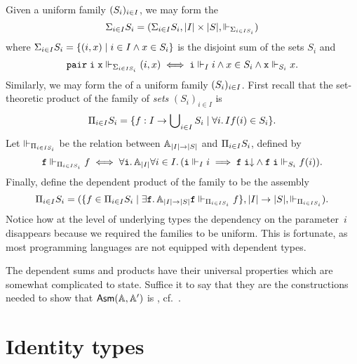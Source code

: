 Given a uniform family $(\asm{S}_i)_{i \in \asm{I}}$, we may form the
%
\begin{equation*}
  \dsum_{i \in \asm{I}} \asm{S}_i =
  (\dsum_{i \in I} S_i, |I| \times |S|, \rz[\dsum_{i \in I S_i}])
\end{equation*}
%
where $\dsum_{i \in I} S_i = \set{(i,x) \such i \in I \land x \in
  S_i}$ is the disjoint sum of the sets $S_i$ and
%
\begin{equation*}
  \combPair\;\R{i}\;\R{x} \rz[\dsum_{i \in I S_i}] (i, x)
  \iff
  \R{i} \rz[I] i
  \land
  x \in S_i
  \land
  \R{x} \rz[S_i] x.  
\end{equation*}
%
Similarly, we may form the  of a uniform
family $(\asm{S}_i)_{i \in \asm{I}}$. First recall that the
set-theoretic product of the family of \emph{sets} $(S_i)_{i \in I}$
is
%
\begin{equation*}
  \dprod_{i \in I} S_i =
  \set{f : I \to \tbigcup_{i \in I} S_i \such
    \all{i}{I}{f(i) \in S_i}
  }.
\end{equation*}
%
Let $\rz[\dprod_{i \in I S_i}]$ be the relation between $\Atyp{|I|
  \to |S|}$ and $\dprod_{i \in I} S_i$, defined by
%
\begin{equation*}
  \R{f} \rz[\dprod_{i \in I S_i}] f
  \iff
  \all{\R{i}}{\Atyp{|I|}}{
    \all{i \in I}
      (\R{i} \rz[I] i
      \implies
      \defined{\R{f}\;\R{i}} \land
      \R{f}\;\R{i} \rz[S_i] f(i))
  }.
\end{equation*}
%
Finally, define the dependent product of the family to be the assembly
%
\begin{equation*}
  \dprod_{i \in \asm{I}} \asm{S}_i =
  (\set{f \in \dprod_{i \in I} S_i \such
    \some{\R{f}}{\Atyp{|I| \to |S|}}{\R{f} \rz[\dprod_{i \in I S_i}]
      f}},
  |I| \to |S|, {\rz[\dprod_{i \in I S_i}]}).
\end{equation*}
%
Notice how at the level of underlying types the dependency on the
parameter~$i$ disappears because we required the families to be
uniform. This is fortunate, as most programming languages are not
equipped with dependent types.

The dependent sums and products have their universal properties which
are somewhat complicated to state. Suffice it to say that they are the
constructions needed to show that $\AsmA$ is , cf.\ .

\section{Identity types}
\label{sec:identity-types}

